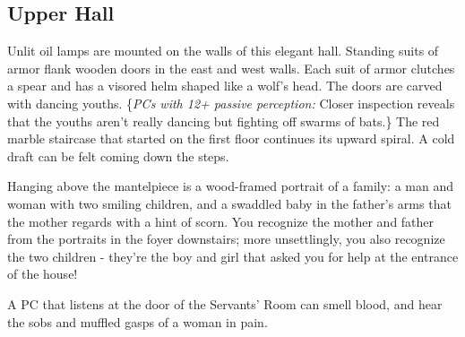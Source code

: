 \pagebreak
\subsection{Upper Hall}
\label{sec:UpperHall}
\begin{readout}
  Unlit oil lamps are mounted on the walls of this elegant hall. Standing suits of armor flank wooden doors in
  the east and west walls. Each suit of armor clutches a spear and has a visored helm shaped like a wolf's head.
  The doors are carved with dancing youths. \{\textit{PCs with 12+ passive perception:} Closer inspection
  reveals that the youths aren't really dancing but fighting off swarms of bats.\} The red marble staircase that
  started on the first floor continues its upward spiral. A cold draft can be felt coming down the steps.
  
  Hanging above the mantelpiece is a wood-framed portrait of a family: a man and woman with two smiling
  children, and a swaddled baby in the father's arms that the mother regards with a hint of scorn. You
  recognize the mother and father from the portraits in the foyer downstairs; more unsettlingly, you also
  recognize the two children - they're the boy and girl that asked you for help at the entrance of the house!
\end{readout}

A PC that listens at the door of the Servants' Room can smell blood, and hear the sobs and muffled gasps of a
woman in pain.

\begin{arealinks}
\end{arealinks}

